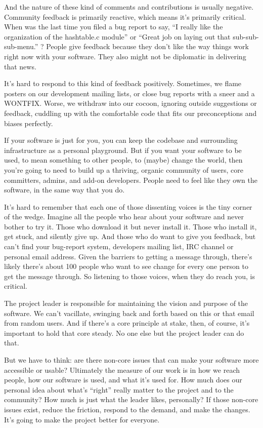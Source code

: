 And the nature of these kind of comments and contributions is usually negative.
Community feedback is primarily reactive, which means it's primarily critical.
When was the last time you filed a bug report to say, “I really like the
organization of the hashtable.c module” or “Great job on laying out that
sub-sub-sub-menu.” ? People give feedback because they don't like the way things
work right now with your software. They also might not be diplomatic in
delivering that news.

It's hard to respond to this kind of feedback positively. Sometimes, we flame
posters on our development mailing lists, or close bug reports with a sneer and
a WONTFIX. Worse, we withdraw into our cocoon, ignoring outside suggestions or
feedback, cuddling up with the comfortable code that fits our preconceptions and
biases perfectly.

If your software is just for you, you can keep the codebase and surrounding
infrastructure as a personal playground. But if you want your software to be
used, to mean something to other people, to (maybe) change the world, then
you're going to need to build up a thriving, organic community of users, core
committers, admins, and add-on developers. People need to feel like they own the
software, in the same way that you do.

It's hard to remember that each one of those dissenting voices is the tiny
corner of the wedge. Imagine all the people who hear about your software and
never bother to try it. Those who download it but never install it. Those who
install it, get stuck, and silently give up. And those who do want to give you
feedback, but can't find your bug-report system, developers mailing list, IRC
channel or personal email address. Given the barriers to getting a message
through, there's likely there's about 100 people who want to see change for
every one person to get the message through. So listening to those voices, when
they do reach you, is critical.

The project leader is responsible for maintaining the vision and purpose of the
software. We can't vacillate, swinging back and forth based on this or that
email from random users. And if there's a core principle at stake, then, of
course, it's important to hold that core steady. No one else but the project
leader can do that.

But we have to think: are there non-core issues that can make your software more
accessible or usable?
Ultimately the measure of our work is in how we reach people, how our software
is used, and what it's used for. How much does our personal idea about what's
“right” really matter to the project and to the community? How much is just what
the leader likes, personally? If those non-core issues exist, reduce the
friction, respond to the demand, and make the changes. It's going to make the
project better for everyone.
